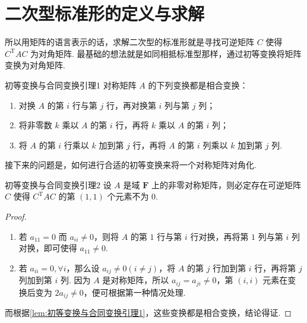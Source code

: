 

\section{二次型标准形的定义与求解}

所以用矩阵的语言表示的话，求解二次型的标准形就是寻找可逆矩阵 $C$ 使得 $C^\mathrm{T}AC$ 为对角矩阵. 最基础的想法就是如同相抵标准型那样，通过初等变换将矩阵变换为对角矩阵.

\begin{lemma}{}{初等变换与合同变换引理1}
    对称矩阵 $A$ 的下列变换都是相合变换：
    \begin{enumerate}
        \item 对换 $A$ 的第 $i$ 行与第 $j$ 行，再对换第 $i$ 列与第 $j$ 列；

        \item 将非零数 $k$ 乘以 $A$ 的第 $i$ 行，再将 $k$ 乘以 $A$ 的第 $i$ 列；

        \item 将 $A$ 的第 $i$ 行乘以 $k$ 加到第 $j$ 行，再将 $A$ 的第 $i$ 列乘以 $k$ 加到第 $j$ 列.
    \end{enumerate}
\end{lemma}

接下来的问题是，如何进行合适的初等变换来将一个对称矩阵对角化.

\begin{lemma}{}{初等变换与合同变换引理2}
    设 $A$ 是域 $\mathbf{F}$ 上的非零对称矩阵，则必定存在可逆矩阵 $C$ 使得 $C^\mathrm{T}AC$ 的第 $(1, 1)$ 个元素不为 $0$.
\end{lemma}

\begin{proof}
    \begin{enumerate}
        \item 若 $a_{11} = 0$ 而 $a_{ii} \neq 0$，则将 $A$ 的第 $1$ 行与第 $i$ 行对换，再将第 $1$ 列与第 $i$ 列对换，即可使得 $a_{11} \neq 0$.
        \item 若 $a_{ii} = 0, \forall i$，那么设 $a_{ij} \neq 0(i \neq j)$，将 $A$ 的第 $j$ 行加到第 $i$ 行，再将第 $j$ 列加到第 $i$ 列. 因为 $A$ 是对称矩阵，所以 $a_{ij} = a_{ji} \neq 0$，第 $(i, i)$ 元素在变换后变为 $2 a_{ij} \neq 0$，便可根据第一种情况处理.
    \end{enumerate}
    而根据\autoref{lem:初等变换与合同变换引理1}，这些变换都是相合变换，结论得证.
\end{proof}

